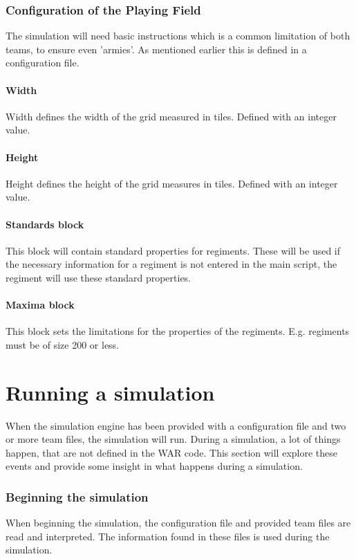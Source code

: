 		\subsubsection{Configuration of the Playing Field}
		The simulation will need basic instructions which is a common limitation of both teams, to ensure even 'armies'. 
		As mentioned earlier this is defined in a configuration file.
		
		\paragraph{Width}
		Width defines the width of the grid measured in tiles.
		Defined with an integer value.
		
		\paragraph{Height}
		Height defines the height of the grid measures in tiles.
		Defined with an integer value.
		
		\paragraph{Standards block}
		This block will contain standard properties for regiments. These will be used if the necessary 
		information for a regiment is not entered in the main script, the regiment will use these standard properties.
		
		\paragraph{Maxima block}
		This block sets the limitations for the properties of the regiments. E.g. regiments must be of size 200 or less.

\section{ Running a simulation }
	When the simulation engine has been provided with a configuration file and two or more team files, the simulation will run. During a simulation, a lot of things happen, that are not defined in the WAR code. This section will explore these events and provide some insight in what happens during a simulation.
		\subsubsection{Beginning the simulation}
		When beginning the simulation, the configuration file and provided team files are read and interpreted. The information found in these files is used during the simulation. 
		
